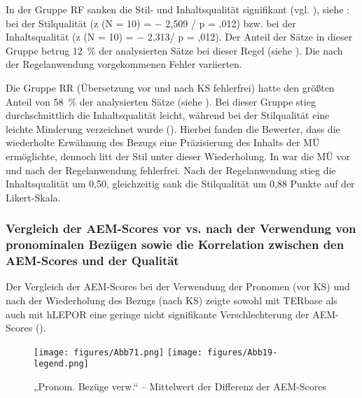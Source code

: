 In der Gruppe RF sanken die Stil- und Inhaltsqualität signifikant (vgl. ), siehe : bei der Stilqualität (z (N = 10) = $-$ 2,509 / p = ,012) bzw. bei der Inhaltsqualität (z (N = 10) = $-$ 2,313/ p = ,012). Der Anteil der Sätze in dieser Gruppe betrug 12~\% der analysierten Sätze bei dieser Regel (siehe ). Die nach der Regelanwendung vorgekommenen Fehler variierten.

Die Gruppe RR (Übersetzung vor und nach KS fehlerfrei) hatte den größten Anteil von 58~\% der analysierten Sätze (siehe ). Bei dieser Gruppe stieg durchschnittlich die Inhaltsqualität leicht, während bei der Stilqualität eine leichte Minderung verzeichnet wurde (). Hierbei fanden die Bewerter, dass die wiederholte Erwähnung des Bezugs eine Präzisierung des Inhalts der MÜ ermöglichte, dennoch litt der Stil unter dieser Wiederholung. In  war die MÜ vor und nach der Regelanwendung fehlerfrei. Nach der Regelanwendung stieg die Inhaltsqualität um 0,50, gleichzeitig sank die Stilqualität um 0,88 Punkte auf der Likert-Skala.

\subsubsection{\label{sec:5.3.4.6}Vergleich der AEM-Scores vor vs. nach der Verwendung von pronominalen Bezügen sowie die Korrelation zwischen den AEM-Scores und der Qualität}

Der Vergleich der AEM-Scores bei der Verwendung der Pronomen (vor KS) und nach der Wiederholung des Bezugs (nach KS) zeigte sowohl mit TERbase als auch mit hLEPOR eine geringe nicht signifikante Verschlechterung der AEM-Scores ().


\begin{figure}






\texttt{[image: figures/Abb71.png]}
\texttt{[image: figures/Abb19-legend.png]}
\caption{\label{fig:05:71}„Pronom. Bezüge verw.“ -- Mittelwert der Differenz der AEM-Scores   }
\end{figure}

